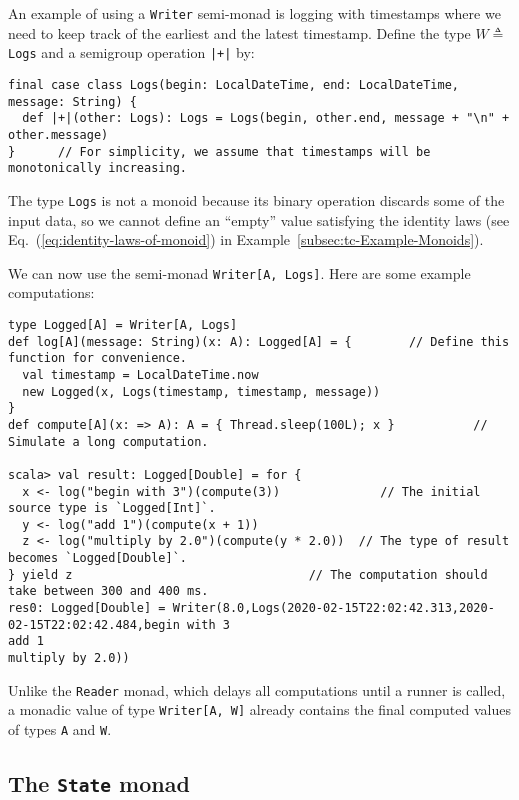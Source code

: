 An example of using a \lstinline!Writer! semi-monad
is logging with timestamps where we need to keep track of the earliest
and the latest timestamp. Define the type $W\triangleq~$\lstinline!Logs!
and a semigroup operation \lstinline!|+|! by:
\begin{lstlisting}
final case class Logs(begin: LocalDateTime, end: LocalDateTime, message: String) {
  def |+|(other: Logs): Logs = Logs(begin, other.end, message + "\n" + other.message)
}      // For simplicity, we assume that timestamps will be monotonically increasing.
\end{lstlisting}
The type \lstinline!Logs! is not a monoid because its binary operation
discards some of the input data, so we cannot define an \textsf{``}empty\textsf{''}
value satisfying the identity laws (see Eq.~(\ref{eq:identity-laws-of-monoid})
in Example~\ref{subsec:tc-Example-Monoids}).

We can now use the semi-monad \lstinline!Writer[A, Logs]!. Here are
some example computations:
\begin{lstlisting}
type Logged[A] = Writer[A, Logs]
def log[A](message: String)(x: A): Logged[A] = {        // Define this function for convenience.
  val timestamp = LocalDateTime.now
  new Logged(x, Logs(timestamp, timestamp, message))
}
def compute[A](x: => A): A = { Thread.sleep(100L); x }           // Simulate a long computation.

scala> val result: Logged[Double] = for {
  x <- log("begin with 3")(compute(3))              // The initial source type is `Logged[Int]`.
  y <- log("add 1")(compute(x + 1))
  z <- log("multiply by 2.0")(compute(y * 2.0))  // The type of result becomes `Logged[Double]`.
} yield z                                 // The computation should take between 300 and 400 ms.
res0: Logged[Double] = Writer(8.0,Logs(2020-02-15T22:02:42.313,2020-02-15T22:02:42.484,begin with 3
add 1
multiply by 2.0))
\end{lstlisting}

Unlike the \lstinline!Reader! monad, which delays all computations
until a runner is called, a monadic value of type \lstinline!Writer[A, W]!
already contains the final computed values of types \lstinline!A!
and \lstinline!W!.

\subsection{The \texttt{State} monad\label{subsec:The-State-monad}}

